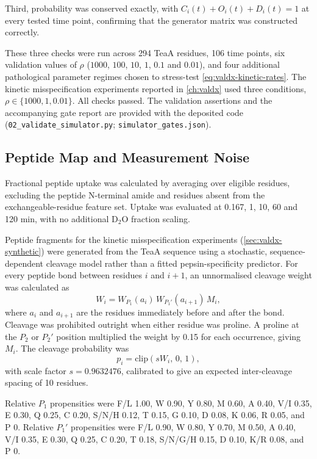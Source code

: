 Third, probability was conserved exactly, with $C_i(t)+O_i(t)+D_i(t)=1$ at every tested time point, confirming that the generator matrix was constructed correctly.

These three checks were run across 294 TeaA residues, 106 time points, six validation values of $\rho$ ($1000$, $100$, $10$, $1$, $0.1$ and $0.01$), and four additional pathological parameter regimes chosen to stress-test \cref{eq:valdx-kinetic-rates}. The kinetic misspecification experiments reported in \cref{ch:valdx} used three conditions, $\rho \in \{1000,1,0.01\}$. All checks passed. The validation assertions and the accompanying gate report are provided with the deposited code (\texttt{02\_validate\_simulator.py}; \texttt{simulator\_gates.json}).

\subsection{Peptide Map and Measurement Noise}
\label{app:valdx-peptide-noise}

Fractional peptide uptake was calculated by averaging over eligible residues, excluding the peptide N-terminal amide and residues absent from the exchangeable-residue feature set. Uptake was evaluated at 0.167, 1, 10, 60 and 120 min, with no additional D$_2$O fraction scaling.

Peptide fragments for the kinetic misspecification experiments (\cref{sec:valdx-synthetic}) were generated from the TeaA sequence using a stochastic, sequence-dependent cleavage model rather than a fitted pepsin-specificity predictor. For every peptide bond between residues $i$ and $i+1$, an unnormalised cleavage weight was calculated as
\begin{equation}
    W_i = W_{P_1}(a_i)\,W_{P_1'}(a_{i+1})\,M_i,
    \label{eq:valdx-pepsin-weight}
\end{equation}
where $a_i$ and $a_{i+1}$ are the residues immediately before and after the bond. Cleavage was prohibited outright when either residue was proline. A proline at the $P_2$ or $P_2'$ position multiplied the weight by 0.15 for each occurrence, giving $M_i$. The cleavage probability was
\begin{equation}
    p_i = \mathrm{clip}(sW_i,\,0,\,1),
    \label{eq:valdx-pepsin-probability}
\end{equation}
with scale factor $s=0.9632476$, calibrated to give an expected inter-cleavage spacing of 10 residues.

Relative $P_1$ propensities were F/L 1.00, W 0.90, Y 0.80, M 0.60, A 0.40, V/I 0.35, E 0.30, Q 0.25, C 0.20, S/N/H 0.12, T 0.15, G 0.10, D 0.08, K 0.06, R 0.05, and P 0. Relative $P_1'$ propensities were F/L 0.90, W 0.80, Y 0.70, M 0.50, A 0.40, V/I 0.35, E 0.30, Q 0.25, C 0.20, T 0.18, S/N/G/H 0.15, D 0.10, K/R 0.08, and P 0.

